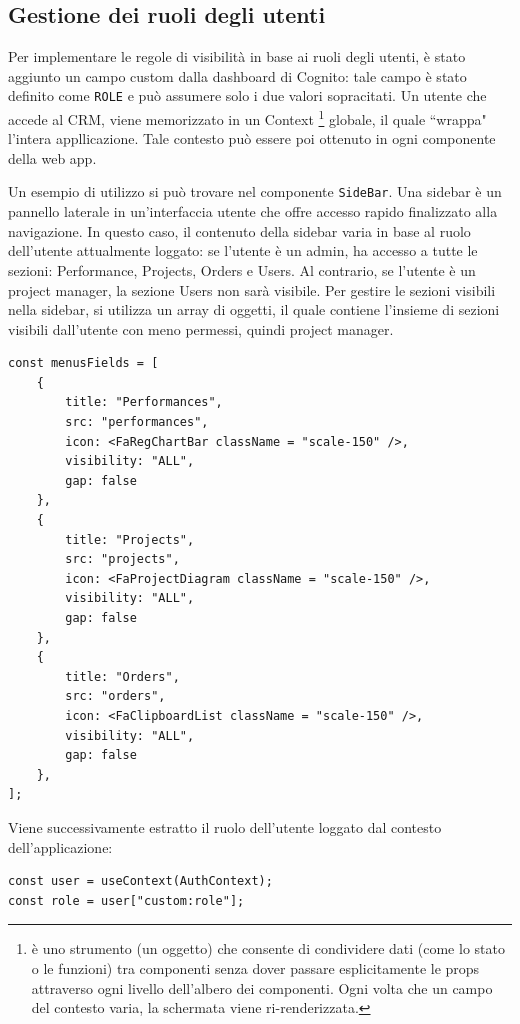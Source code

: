 \documentclass[target=bach,aauheader=,style=]{thud}
\begin{document}
\subsection{Gestione dei ruoli degli utenti}
Per implementare le regole di visibilità in base ai ruoli degli utenti, è stato aggiunto un campo custom dalla dashboard di Cognito: tale campo è stato definito come \texttt{ROLE} e può assumere solo i due valori sopracitati. Un utente che accede al CRM, viene memorizzato in un Context \footnote{è uno strumento (un oggetto) che consente di condividere dati (come lo stato o le funzioni) tra componenti senza dover passare esplicitamente le props attraverso ogni livello dell'albero dei componenti. Ogni volta che un campo del contesto varia, la schermata viene ri-renderizzata.} globale, il quale ``wrappa" l'intera appllicazione. Tale contesto può essere poi ottenuto in ogni componente della web app. 

\noindent Un esempio di utilizzo si può trovare nel componente \texttt{SideBar}. Una sidebar è un pannello laterale in un'interfaccia utente che offre accesso rapido finalizzato alla navigazione. In questo caso, il contenuto della sidebar varia in base al ruolo dell'utente attualmente loggato: se l'utente è un admin, ha accesso a tutte le sezioni: Performance, Projects, Orders e Users. Al contrario, se l'utente è un project manager, la sezione Users non sarà visibile. Per gestire le sezioni visibili nella sidebar, si utilizza un array di oggetti, il quale contiene l'insieme di sezioni visibili dall'utente con meno permessi, quindi project manager. 

\begin{lstlisting}[caption=Campi default visibili nella sidebar]
const menusFields = [
    {
        title: "Performances",
        src: "performances",
        icon: <FaRegChartBar className = "scale-150" />,
        visibility: "ALL",
        gap: false
    },
    {
        title: "Projects",
        src: "projects",
        icon: <FaProjectDiagram className = "scale-150" />,
        visibility: "ALL",
        gap: false
    },
    {
        title: "Orders",
        src: "orders",
        icon: <FaClipboardList className = "scale-150" />,
        visibility: "ALL",
        gap: false
    },
];
\end{lstlisting}

\noindent Viene successivamente estratto il ruolo dell'utente loggato dal contesto dell'applicazione:

\begin{lstlisting}[caption=Parte del file \texttt{AuthenticatedLayout.tsx} del CRM]
const user = useContext(AuthContext);
const role = user["custom:role"];
\end{lstlisting}
\end{document}

